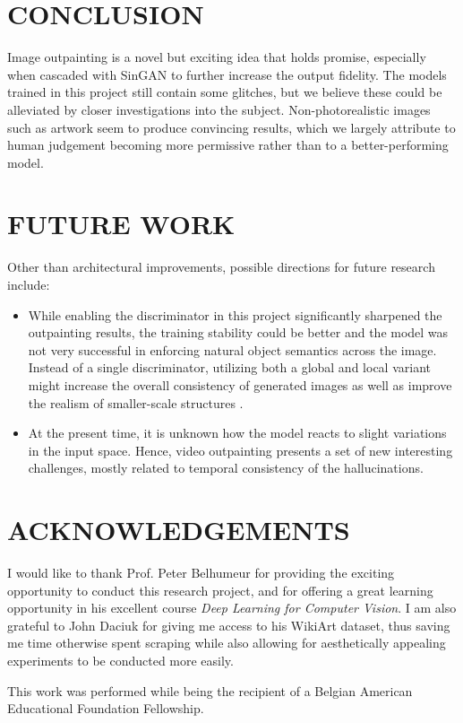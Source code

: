 \documentclass[twocolumn,showpacs,nofootinbib,aps,superscriptaddress,eqsecnum,prd,notitlepage,showkeys,10pt]{revtex4-1}
\begin{document}
\section{CONCLUSION}

\hspace{\parindent} Image outpainting is a novel but exciting idea that holds promise, especially when cascaded with SinGAN to further increase the output fidelity. The models trained in this project still contain some glitches, but we believe these could be alleviated by closer investigations into the subject. Non-photorealistic images such as artwork seem to produce convincing results, which we largely attribute to human judgement becoming more permissive rather than to a better-performing model.

\section{FUTURE WORK}

\hspace{\parindent}  Other than architectural improvements, possible directions for future research include:
\begin{itemize}
  \item While enabling the discriminator in this project significantly sharpened the outpainting results, the training stability could be better and the model was not very successful in enforcing natural object semantics across the image. Instead of a single discriminator, utilizing both a global and local variant might increase the overall consistency of generated images as well as improve the realism of smaller-scale structures \cite{Iizuka2017}.
  \item At the present time, it is unknown how the model reacts to slight variations in the input space. Hence, video outpainting presents a set of new interesting challenges, mostly related to temporal consistency of the hallucinations.
\end{itemize}

\section*{ACKNOWLEDGEMENTS}

\hspace{\parindent} I would like to thank Prof. Peter Belhumeur for providing the exciting opportunity to conduct this research project, and for offering a great learning opportunity in his excellent course \textit{Deep Learning for Computer Vision}. I am also grateful to John Daciuk for giving me access to his WikiArt dataset, thus saving me time otherwise spent scraping while also allowing for aesthetically appealing experiments to be conducted more easily.

This work was performed while being the recipient of a Belgian American Educational Foundation Fellowship.




\end{document}
